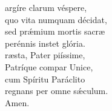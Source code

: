 
\vspace{0.15cm}

\def\greinitialformat#1{{\fontsize{40}{40}\selectfont #1}}


\vspace{0.3cm}


\vspace{0.15cm}

\def\greinitialformat#1{{\fontsize{40}{40}\selectfont #1}}

\begin{multicols}{2}

\noindent{}argíre clarum véspere,\\ 
quo vita numquam décidat,\\ 
sed pr\'{æ}mium mortis sacræ\\
perénnis instet glória.\\

\noindent{}ræsta, Pater piíssime,\\ 
Patríque compar Unice, \\
cum Spíritu Paráclito\\
regnans per omne s\'{æ}culum.\\
Amen.\\

\end{multicols}


\newpage